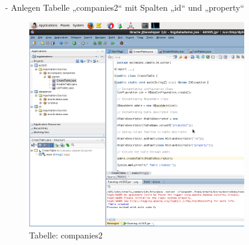 \begin{itemize}
\item[-]Anlegen Tabelle „companies2“ mit Spalten „id“ und „property“
\begin{figure}[!htb]
        \begin{minipage}{1\textwidth}
                \centering
                \includegraphics[width=0.90\textwidth]{pics/hbase1.png}\par\vspace{0cm}
                \caption{Tabelle: companies2}
                \label{fig:hbase1}
        \end{minipage}
\end{figure}


\end{itemize}
